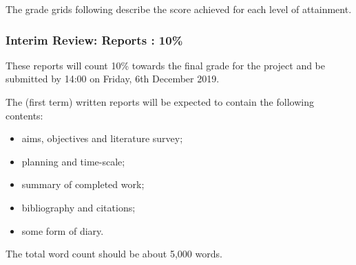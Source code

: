 \documentclass[11pt]{article}
\newcommand{\reviewSubmissiondate}{14:00 on Friday, 6th December 2019} %
\newcommand{\interimreportweight}{10\% }
\newcommand{\interimReportLength}{5,000 }
\begin{document}
The grade grids following describe the score achieved for each level of attainment.
\newpage
\subsubsection{Interim Review: Reports : \interimreportweight}
These reports will count \interimreportweight towards the final grade for the project and be submitted by \reviewSubmissiondate.

The (first term) written reports will be expected to contain the following contents:
\begin{itemize}
\item aims, objectives and literature survey;
\item planning and time-scale;
\item summary of completed work;
\item bibliography and citations;
\item some form of diary.
\end{itemize}

The total word count should be about \interimReportLength words. \bigskip
\end{document}
